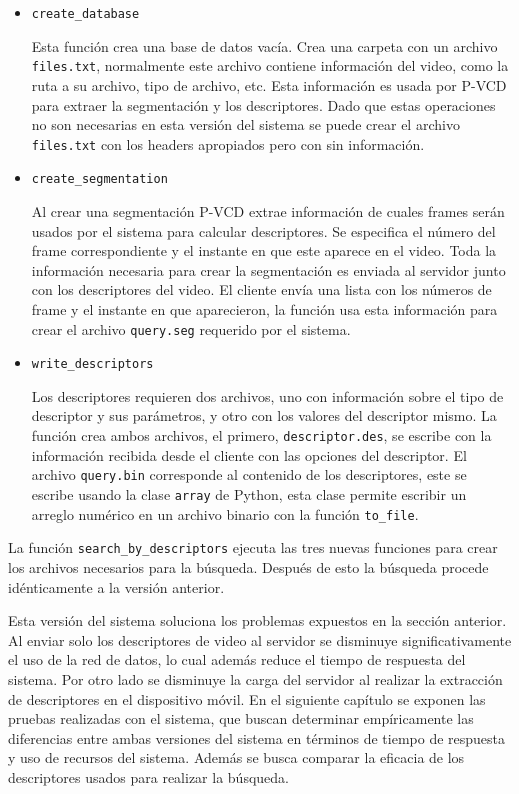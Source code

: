 \begin{itemize}

\item{\texttt{create\_database}} 

Esta función crea una base de datos vacía. Crea una carpeta con un archivo \texttt{files.txt}, normalmente este archivo contiene información del video, como la ruta a su archivo, tipo de archivo, etc. Esta información es usada por P-VCD para extraer la segmentación y los descriptores. Dado que estas operaciones no son necesarias en esta versión del sistema se puede crear el archivo \texttt{files.txt} con los headers apropiados pero con sin información. 

\item{\texttt{create\_segmentation}} 

Al crear una segmentación P-VCD extrae información de cuales frames serán usados por el sistema para calcular descriptores. Se especifica el número del frame correspondiente y el instante en que este aparece en el video. Toda la información necesaria para crear la 
segmentación es enviada al servidor junto con los descriptores del video. El cliente envía una lista con los números de frame y el instante en que aparecieron, la función usa esta información para crear el archivo \texttt{query.seg} requerido por el sistema. 

\item{\texttt{write\_descriptors}} 

Los descriptores requieren dos archivos, uno con información sobre el tipo de descriptor y sus parámetros, y otro con los valores del descriptor mismo. La función crea ambos archivos, el primero, \texttt{descriptor.des}, se escribe con la información recibida desde el cliente con las opciones del descriptor. El archivo \texttt{query.bin} corresponde al contenido de los descriptores, este se escribe usando la clase \texttt{array} de Python, esta clase permite escribir un arreglo numérico en un archivo binario con la función \texttt{to\_file}.  
\end{itemize}

La función \texttt{search\_by\_descriptors} ejecuta las tres nuevas funciones para crear los archivos necesarios para la búsqueda. Después de esto la búsqueda procede idénticamente a la versión anterior.

Esta versión del sistema soluciona los problemas expuestos en la sección anterior. Al enviar solo los descriptores de video al servidor se disminuye significativamente el uso de la red de datos, lo cual además reduce el tiempo de respuesta del sistema. Por otro lado se disminuye la carga del servidor al realizar la extracción de descriptores en el dispositivo móvil. En el siguiente capítulo se exponen las pruebas realizadas con el sistema, que buscan determinar empíricamente las diferencias entre ambas versiones del sistema en términos de tiempo de respuesta y uso de recursos del sistema. Además se busca comparar la eficacia de los descriptores usados para realizar la búsqueda. 
